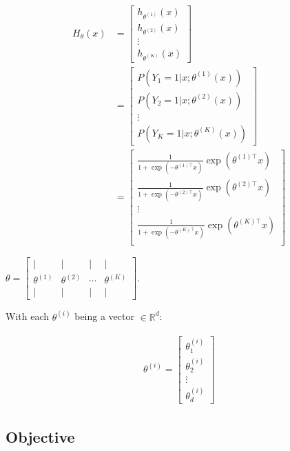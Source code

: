 \begin{align} 
	H_\theta(x) 
		&= \begin{bmatrix} 
			h_{\theta^{(1)}}(x) \\ 
			h_{\theta^{(2)}}(x) \\ 
			\vdots \\ 
			h_{\theta^{(K)}}(x) 
		\end{bmatrix} \\
		&=
		\begin{bmatrix} 
			P(Y_1 = 1 | x; \theta^{(1)}(x)) \\ 
			P(Y_2 = 1 | x; \theta^{(2)}(x)) \\ 
			\vdots \\ 
			P(Y_K = 1 | x; \theta^{(K)}(x)) 
		\end{bmatrix} \\
		&= 
		\begin{bmatrix} 
			\frac{1}{1 + \exp(-\theta^{(1)\top} x)} \exp(\theta^{(1)\top} x ) \\ 
			\frac{1}{1 + \exp(-\theta^{(2)\top} x)}\exp(\theta^{(2)\top} x ) \\ 
			\vdots \\ 
			\frac{1}{1 + \exp(-\theta^{(K)\top} x)}\exp(\theta^{(K)\top} x ) \\ 
		\end{bmatrix} 
\end{align}


$\theta = \left[\begin{array}{cccc}| & | & | & | \\ \theta^{(1)} & \theta^{(2)} & \cdots & \theta^{(K)} \\ | & | & | & | \end{array}\right]$.

With each $\theta^{(i)}$ being a vector $\in \mathbb{R}^{d}$:

\begin{align}
	\theta^{(i)} = \left[
		\begin{array}{cccc}
			\theta_{1}^{(i)} \\
			\theta_{2}^{(i)} \\
			\vdots \\
			\theta_{d}^{(i)}
		\end{array}\right]
\end{align}


\subsection{Objective}


